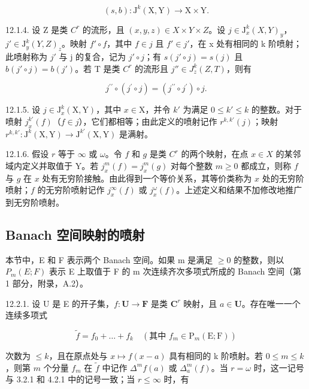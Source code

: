 \[
(s, b): \mathrm{J} ^ {k} (\mathrm{X}, \mathrm{Y}) \rightarrow \mathrm{X} \times \mathrm{Y}.
\]

12.1.4. 设 Z 是类 \(C^{r}\) 的流形，且 \((x, y, z) \in X \times Y \times Z\)。设 \(j \in \mathrm{J}_{x}^{k}(X, Y)_{y}\)，\(j' \in \mathrm{J}_{y}^{k}(Y, Z)_{z}\)。映射 \(f' \circ f\)，其中 \(f \in j\) 且 \(f' \in j'\)，在 x 处有相同的 k 阶喷射；此喷射称为 \(j'\) 与 j 的复合，记为 \(j' \circ j\)；有 \(s(j' \circ j) = s(j)\) 且 \(b(j' \circ j) = b(j')\)。若 T 是类 \(C^{r}\) 的流形且 \(j'' \in J_{z}^{k}(Z, T)\)，则有

\[
j ^ {\prime \prime} \circ (j ^ {\prime} \circ j) = (j ^ {\prime \prime} \circ j ^ {\prime}) \circ j.
\]

12.1.5. 设 \(j \in \mathrm{J}_x^k(\mathrm{X}, \mathrm{Y})\)，其中 \(x \in \mathrm{X}\)，并令 \(k'\) 为满足 \(0 \leqslant k' \leqslant k\) 的整数。对于喷射 \(j_x^{k'}(f)\)（\(f \in j\)），它们都相等；由此定义的喷射记作 \(r^{k, k'}(j)\)；映射 \(r^{k, k'}: \mathrm{J}^k(\mathrm{X}, \mathrm{Y}) \to \mathrm{J}^{k'}(\mathrm{X}, \mathrm{Y})\) 是满射。

12.1.6. 假设 \(r\) 等于 \(\infty\) 或 \(\omega\)。令 \(f\) 和 \(g\) 是类 \(C^{r}\) 的两个映射，在点 \(x \in X\) 的某邻域内定义并取值于 Y。若 \(j_x^m(f) = j_x^m(g)\) 对每个整数 \(m \geqslant 0\) 都成立，则称 \(f\) 与 \(g\) 在 \(x\) 处有无穷阶接触。由此得到一个等价关系，其等价类称为 \(x\) 处的无穷阶喷射；\(f\) 的无穷阶喷射记作 \(j_x^\infty(f)\) 或 \(j_x^\omega(f)\)。上述定义和结果不加修改地推广到无穷阶喷射。

\subsection{Banach 空间映射的喷射}

本节中，E 和 F 表示两个 Banach 空间。如果 m 是满足 \(\geqslant0\) 的整数，则以 \(P_{m}(E;F)\) 表示 E 上取值于 F 的 m 次连续齐次多项式所成的 Banach 空间（第 1 部分，附录，A.2）。

12.2.1. 设 U 是 E 的开子集，\(f\colon\mathbf{U}\to\mathbf{F}\) 是类 \(\mathbf{C}^{r}\) 映射，且 \(a\in\mathbf{U}\)。存在唯一一个连续多项式

\[
\tilde {f} = f _ {0} + \dots + f _ {k} \quad (\text{其中 }f _ {m} \in \mathrm{P} _ {m} (\mathrm{E}; \mathrm{F}))
\]

次数为 \(\leqslant k\)，且在原点处与 \(x \mapsto f(x - a)\) 具有相同的 k 阶喷射。若 \(0 \leqslant m \leqslant k\)，则第 \(m\) 个分量 \(f_m\) 在 \(\tilde{f}\) 中记作 \(\Delta^m f(a)\) 或 \(\Delta_a^m(f)\)。当 \(r = \omega\) 时，这一记号与 3.2.1 和 4.2.1 中的记号一致；当 \(r \leqslant \infty\) 时，有

